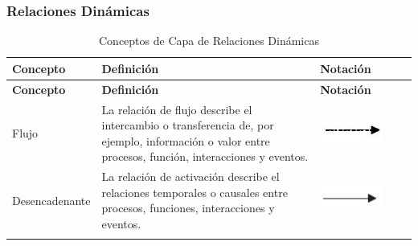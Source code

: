 \subsubsection{Relaciones Dinámicas}
\begin{center}
	\begin{longtable}[H]{| >{\centering\arraybackslash}m{3cm} | >{\arraybackslash}m{6cm} | p{4cm} | p{5cm} | p{4cm} |}
		
		\hline
		\textbf{Concepto} &  \centering \textbf{Definición} & \textbf{Notación} \\
		\hline
		\endfirsthead
		
		
		\hline
		\textbf{Concepto} &  \centering \textbf{Definición} & \textbf{Notación} \\
		\hline
		\endhead
		
		Flujo      
		& \vspace{1mm} La relación de flujo describe el intercambio
		o transferencia de, por ejemplo, información o
		valor entre procesos, función,
		interacciones y eventos.       
		&\includegraphics[width=30mm,trim=0 0 0 -2mm]{imagenes/lenguaje/relaciones/flujo}  \\ \hline
		
		Desencadenante
		& \vspace{1mm} La relación de activación describe el
		relaciones temporales o causales entre
		procesos, funciones, interacciones y eventos.  
		& \includegraphics[width=35mm,trim=0 0 0 -2mm]{imagenes/lenguaje/relaciones/triggering}  \\ \hline
		
		\caption{Conceptos de Capa de Relaciones Dinámicas}
		
	\end{longtable}
\end{center}

